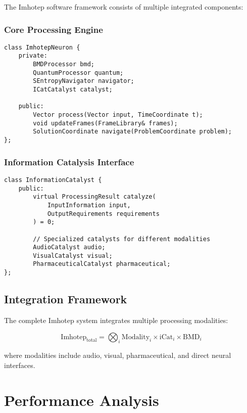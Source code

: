 \documentclass[12pt,a4paper]{article}
\theoremstyle{remark}
\begin{document}
The Imhotep software framework consists of multiple integrated components:

\subsubsection{Core Processing Engine}

\begin{verbatim}
class ImhotepNeuron {
    private:
        BMDProcessor bmd;
        QuantumProcessor quantum;
        SEntropyNavigator navigator;
        ICatCatalyst catalyst;
        
    public:
        Vector process(Vector input, TimeCoordinate t);
        void updateFrames(FrameLibrary& frames);
        SolutionCoordinate navigate(ProblemCoordinate problem);
};
\end{verbatim}

\subsubsection{Information Catalysis Interface}

\begin{verbatim}
class InformationCatalyst {
    public:
        virtual ProcessingResult catalyze(
            InputInformation input,
            OutputRequirements requirements
        ) = 0;
        
        // Specialized catalysts for different modalities
        AudioCatalyst audio;
        VisualCatalyst visual;
        PharmaceuticalCatalyst pharmaceutical;
};
\end{verbatim}

\subsection{Integration Framework}

The complete Imhotep system integrates multiple processing modalities:

\begin{equation}
\text{Imhotep}_{\text{total}} = \bigotimes_{i} \text{Modality}_i \times \text{iCat}_i \times \text{BMD}_i
\end{equation}

where modalities include audio, visual, pharmaceutical, and direct neural interfaces.

\section{Performance Analysis}
\end{document}
